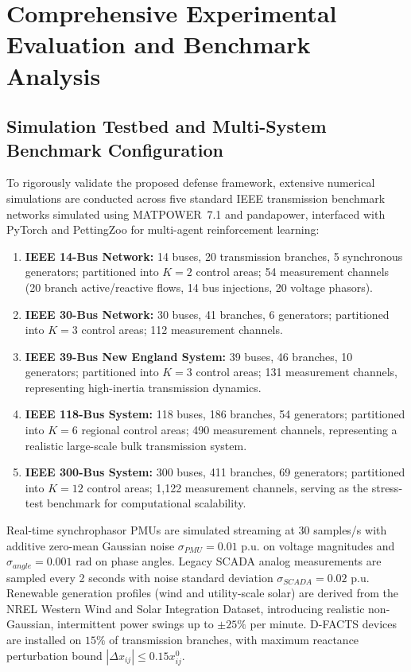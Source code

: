 \documentclass[journal,compsoc]{IEEEtran}
\begin{document}
\section{Comprehensive Experimental Evaluation and Benchmark Analysis}
\label{sec:evaluation}

\subsection{Simulation Testbed and Multi-System Benchmark Configuration}
To rigorously validate the proposed defense framework, extensive numerical simulations are conducted across five standard IEEE transmission benchmark networks simulated using MATPOWER~7.1 \cite{ref38} and pandapower, interfaced with PyTorch and PettingZoo for multi-agent reinforcement learning:
\begin{enumerate}
    \item \textbf{IEEE 14-Bus Network:} 14 buses, 20 transmission branches, 5 synchronous generators; partitioned into $K = 2$ control areas; 54 measurement channels (20 branch active/reactive flows, 14 bus injections, 20 voltage phasors).
    \item \textbf{IEEE 30-Bus Network:} 30 buses, 41 branches, 6 generators; partitioned into $K = 3$ control areas; 112 measurement channels.
    \item \textbf{IEEE 39-Bus New England System:} 39 buses, 46 branches, 10 generators; partitioned into $K = 3$ control areas; 131 measurement channels, representing high-inertia transmission dynamics.
    \item \textbf{IEEE 118-Bus System:} 118 buses, 186 branches, 54 generators; partitioned into $K = 6$ regional control areas; 490 measurement channels, representing a realistic large-scale bulk transmission system.
    \item \textbf{IEEE 300-Bus System:} 300 buses, 411 branches, 69 generators; partitioned into $K = 12$ control areas; 1,122 measurement channels, serving as the stress-test benchmark for computational scalability.
\end{enumerate}

Real-time synchrophasor PMUs are simulated streaming at 30 samples/s with additive zero-mean Gaussian noise $\sigma_{PMU} = 0.01\text{ p.u.}$ on voltage magnitudes and $\sigma_{angle} = 0.001\text{ rad}$ on phase angles. Legacy SCADA analog measurements are sampled every 2 seconds with noise standard deviation $\sigma_{SCADA} = 0.02\text{ p.u.}$ Renewable generation profiles (wind and utility-scale solar) are derived from the NREL Western Wind and Solar Integration Dataset, introducing realistic non-Gaussian, intermittent power swings up to $\pm 25\%$ per minute. D-FACTS devices are installed on $15\%$ of transmission branches, with maximum reactance perturbation bound $|\Delta x_{ij}| \le 0.15 x_{ij}^0$.
\end{document}
